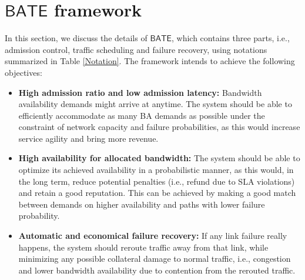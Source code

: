 \documentclass[sigconf]{acmart}
\begin{document}
\section{$\mathsf{BATE}$ framework}\label{HATE}
In this section, we discuss the details of $\mathsf{BATE}$, which contains three parts, i.e., admission control, traffic scheduling and failure recovery, using notations summarized in Table \ref{Notation}. 
The framework intends to achieve the following objectives: 
 \begin{itemize}
\item \textbf{High admission ratio and low admission latency:}  
  Bandwidth availability demands might arrive at anytime. 
  The system should be able to efficiently accommodate as many BA demands as possible under the constraint of network capacity and failure probabilities, as this would increase service agility and bring more revenue. %
\item \textbf{High availability for allocated bandwidth:}
The system should be able to optimize its achieved availability in a probabilistic manner, 
as this would, in the long term, reduce potential penalties (i.e., refund due to SLA violations) and retain a good reputation. This can be achieved by making a good match between demands on higher availability and paths with lower failure probability.
\item \textbf{Automatic and economical failure recovery:}
If any link failure really happens, the system should reroute traffic away from that link, 
while minimizing any possible collateral damage to normal traffic, i.e., congestion and lower bandwidth availability due to contention from the rerouted traffic.
%
\end{itemize}
\end{document}
